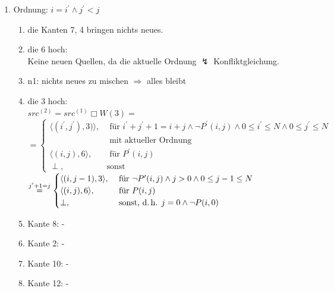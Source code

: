 \begin{enumerate}
{\begin{enumerate}
        \end{enumerate}
        }
    \item {Ordnung: \(i=i^\prime \land j^\prime < j\) \\
      \begin{enumerate}
         \item die Kanten 7, 4 bringen nichts neues.
         \item die 6 hoch: \\
           Keine neuen Quellen, da die aktuelle Ordnung $\lightning$ Konfliktgleichung.
         \item n1: nichts neues zu mischen \(\Rightarrow\) alles bleibt
         \item die 3 hoch: \\
           \(src^{(2)} = src^{(1)} \Box W(3) = \) \\ \( =
           \begin{cases} \langle ( i^\prime, j^\prime), 3) \rangle, & \mbox{ für } i^\prime + j^\prime + 1 = i + j \land \neg P^\prime(i,j) \land 0 \leq i^\prime \leq N \land 0 \leq j^\prime \leq N \\ & \mbox{ mit aktueller Ordnung}\\
             \langle (i,j),6 \rangle , & \mbox{ für } P^\prime(i,j) \\
             \perp, & \mbox{sonst}
           \end{cases}
\)
           \\ \(\stackrel{j^\prime+1=j}{=}
           \begin{cases}
             \langle ( i, j-1), 3 \rangle, & \mbox{ für }\neg P^\prime(i,j) \land j > 0 \land 0 \leq j-1 \leq N \\
             \langle (i,j),6 \rangle , & \mbox{ für } P (i,j) \\
             \perp , & \mbox{ sonst, d.\,h. } j = 0 \land \neg P(i,0)
           \end{cases}
           \)
         \item Kante 8: -
         \item Kante 2: -
         \item Kante 10: -
         \item Kante 12: -
      \end{enumerate}
      }


\end{enumerate}
